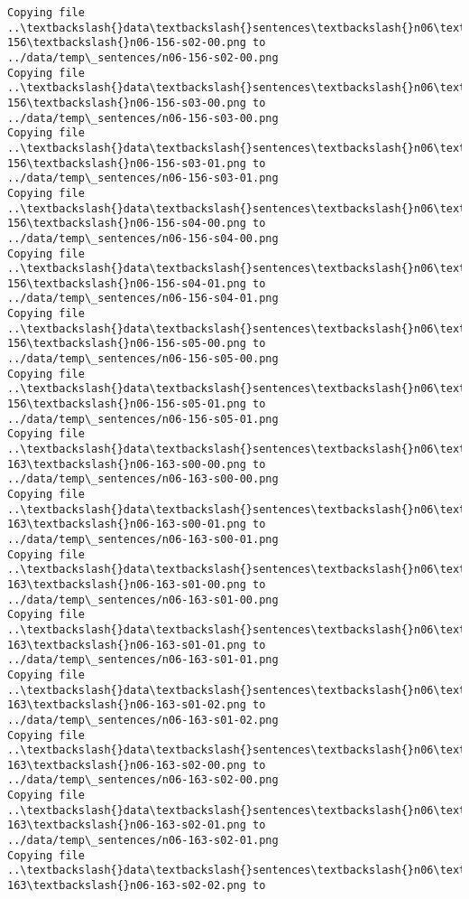 \documentclass[11pt]{article}
\begin{document}
\begin{Verbatim}[commandchars=\\\{\}]
Copying file ..\textbackslash{}data\textbackslash{}sentences\textbackslash{}n06\textbackslash{}n06-156\textbackslash{}n06-156-s02-00.png to
../data/temp\_sentences/n06-156-s02-00.png
Copying file ..\textbackslash{}data\textbackslash{}sentences\textbackslash{}n06\textbackslash{}n06-156\textbackslash{}n06-156-s03-00.png to
../data/temp\_sentences/n06-156-s03-00.png
Copying file ..\textbackslash{}data\textbackslash{}sentences\textbackslash{}n06\textbackslash{}n06-156\textbackslash{}n06-156-s03-01.png to
../data/temp\_sentences/n06-156-s03-01.png
Copying file ..\textbackslash{}data\textbackslash{}sentences\textbackslash{}n06\textbackslash{}n06-156\textbackslash{}n06-156-s04-00.png to
../data/temp\_sentences/n06-156-s04-00.png
Copying file ..\textbackslash{}data\textbackslash{}sentences\textbackslash{}n06\textbackslash{}n06-156\textbackslash{}n06-156-s04-01.png to
../data/temp\_sentences/n06-156-s04-01.png
Copying file ..\textbackslash{}data\textbackslash{}sentences\textbackslash{}n06\textbackslash{}n06-156\textbackslash{}n06-156-s05-00.png to
../data/temp\_sentences/n06-156-s05-00.png
Copying file ..\textbackslash{}data\textbackslash{}sentences\textbackslash{}n06\textbackslash{}n06-156\textbackslash{}n06-156-s05-01.png to
../data/temp\_sentences/n06-156-s05-01.png
Copying file ..\textbackslash{}data\textbackslash{}sentences\textbackslash{}n06\textbackslash{}n06-163\textbackslash{}n06-163-s00-00.png to
../data/temp\_sentences/n06-163-s00-00.png
Copying file ..\textbackslash{}data\textbackslash{}sentences\textbackslash{}n06\textbackslash{}n06-163\textbackslash{}n06-163-s00-01.png to
../data/temp\_sentences/n06-163-s00-01.png
Copying file ..\textbackslash{}data\textbackslash{}sentences\textbackslash{}n06\textbackslash{}n06-163\textbackslash{}n06-163-s01-00.png to
../data/temp\_sentences/n06-163-s01-00.png
Copying file ..\textbackslash{}data\textbackslash{}sentences\textbackslash{}n06\textbackslash{}n06-163\textbackslash{}n06-163-s01-01.png to
../data/temp\_sentences/n06-163-s01-01.png
Copying file ..\textbackslash{}data\textbackslash{}sentences\textbackslash{}n06\textbackslash{}n06-163\textbackslash{}n06-163-s01-02.png to
../data/temp\_sentences/n06-163-s01-02.png
Copying file ..\textbackslash{}data\textbackslash{}sentences\textbackslash{}n06\textbackslash{}n06-163\textbackslash{}n06-163-s02-00.png to
../data/temp\_sentences/n06-163-s02-00.png
Copying file ..\textbackslash{}data\textbackslash{}sentences\textbackslash{}n06\textbackslash{}n06-163\textbackslash{}n06-163-s02-01.png to
../data/temp\_sentences/n06-163-s02-01.png
Copying file ..\textbackslash{}data\textbackslash{}sentences\textbackslash{}n06\textbackslash{}n06-163\textbackslash{}n06-163-s02-02.png to

\end{Verbatim}
\end{document}
